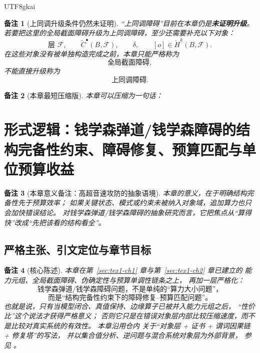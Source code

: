 \documentclass[12pt]{article}
\newtheorem{remark}{备注}[section]
\begin{document}
\begin{CJK*}{UTF8}{gkai}
\begin{remark}[上同调升级条件仍然未证明]
“上同调障碍”目前在本章仍是\textbf{未证明升级}。
若要把这里的全局截面障碍升级为上同调障碍，至少还需要补充以下对象：
\[
  \text{层 }\mathcal F,
  \qquad
  \check C^\bullet(B,\mathcal F),
  \qquad
  \delta,
  \qquad
  [o]\in \check H^k(B,\mathcal F).
\]
在这些对象没有被单独构造完成之前，本章只能严格称为
\[
  \text{全局截面障碍},
\]
不能直接升级称为
\[
  \text{上同调障碍}.
\]
\end{remark}

\begin{remark}[本章最短压缩版]
本章可以压缩为一句话：
\begin{center}
\end{center}
\begin{center}
\end{center}
\end{remark}

\clearpage
\section{形式逻辑：钱学森弹道/钱学森障碍的结构完备性约束、障碍修复、预算匹配与单位预算收益}
\label{sec:tex1-ch3}

\begin{remark}[本章意义备注：高超音速攻防的抽象语境]
本章的意义，在于明确结构完备性先于预算效率；
如果关键状态、模式或约束未被纳入对象域，追加算力也只会加快错误结论。
对钱学森弹道/钱学森障碍的抽象研究而言，它把焦点从“算得快”改成“先把该看的结构看全”。
\end{remark}

\subsection{严格主张、引文定位与章节目标}
\label{subsec:tex1-ch3-claim}

\begin{remark}[核心陈述]
本章在第~\ref{sec:tex1-ch1} 章与第~\ref{sec:tex1-ch2} 章已建立的
能力元组、全局截面障碍、伪确定性与预算单调性链条之上，
再加一层严格化：
\[
  \text{钱学森弹道/钱学森障碍问题，不是单纯的“算力大小问题”，}
\]
\[
  \text{而是“结构完备性约束下的障碍修复--预算匹配问题”。}
\]
也就是说，只有当模型闭合、真值保持、边缘算子已被并入能力元组之后，
“性价比”这个说法才获得严格意义；
否则它只是在错误对象层内部比较压缩速度，而不是比较对真实系统的有效性。
本章沿用仓内
\cite{RepoTex17EdgeOperator,RepoTex29RepairableObstruction,RepoTex32FiberSectionHole,RepoTex38JacobiBianchiRepair,
  RepoTex43OpenHeterogeneous}
关于“对象层 + 证书 + 谓词因果链 + 修复塔”的写法，
并以集合值分析、逆问题与混合系统对象层为外部背景，
参见
\cite{Isakov2006InversePDE,Liberzon2003Switching,AubinFrankowska2009SetValued,Husemoller1994FibreBundles}。
\end{remark}


\end{CJK*}
\end{document}
